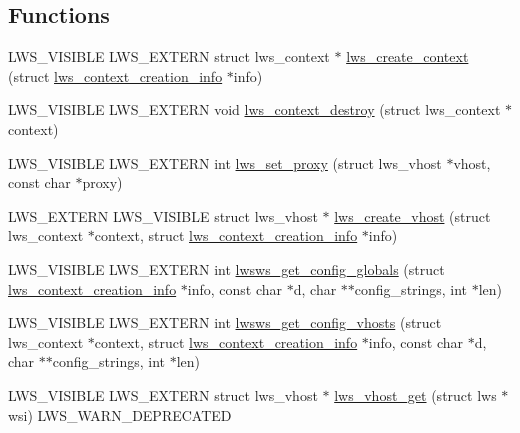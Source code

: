 \subsection*{Functions}
\begin{DoxyCompactItemize}
\item 
L\+W\+S\+\_\+\+V\+I\+S\+I\+B\+LE L\+W\+S\+\_\+\+E\+X\+T\+E\+RN struct lws\+\_\+context $\ast$ \hyperlink{group__context-and-vhost_gaf2fff58562caab7510c41eeac85a8648}{lws\+\_\+create\+\_\+context} (struct \hyperlink{structlws__context__creation__info}{lws\+\_\+context\+\_\+creation\+\_\+info} $\ast$info)
\item 
L\+W\+S\+\_\+\+V\+I\+S\+I\+B\+LE L\+W\+S\+\_\+\+E\+X\+T\+E\+RN void \hyperlink{group__context-and-vhost_ga8ee0314028755f1ddfa9428e09b4fddb}{lws\+\_\+context\+\_\+destroy} (struct lws\+\_\+context $\ast$context)
\item 
L\+W\+S\+\_\+\+V\+I\+S\+I\+B\+LE L\+W\+S\+\_\+\+E\+X\+T\+E\+RN int \hyperlink{group__context-and-vhost_ga7e9d5405547a457d86e0b4f0ae2bb1c4}{lws\+\_\+set\+\_\+proxy} (struct lws\+\_\+vhost $\ast$vhost, const char $\ast$proxy)
\item 
L\+W\+S\+\_\+\+E\+X\+T\+E\+RN L\+W\+S\+\_\+\+V\+I\+S\+I\+B\+LE struct lws\+\_\+vhost $\ast$ \hyperlink{group__context-and-vhost_ga0c54c667ccd9b8b3dddcd123ca72f87c}{lws\+\_\+create\+\_\+vhost} (struct lws\+\_\+context $\ast$context, struct \hyperlink{structlws__context__creation__info}{lws\+\_\+context\+\_\+creation\+\_\+info} $\ast$info)
\item 
L\+W\+S\+\_\+\+V\+I\+S\+I\+B\+LE L\+W\+S\+\_\+\+E\+X\+T\+E\+RN int \hyperlink{group__context-and-vhost_ga98d88c9080fd89c37114363a6474ea73}{lwsws\+\_\+get\+\_\+config\+\_\+globals} (struct \hyperlink{structlws__context__creation__info}{lws\+\_\+context\+\_\+creation\+\_\+info} $\ast$info, const char $\ast$d, char $\ast$$\ast$config\+\_\+strings, int $\ast$len)
\item 
L\+W\+S\+\_\+\+V\+I\+S\+I\+B\+LE L\+W\+S\+\_\+\+E\+X\+T\+E\+RN int \hyperlink{group__context-and-vhost_ga341064721add2618ae1b29717493a212}{lwsws\+\_\+get\+\_\+config\+\_\+vhosts} (struct lws\+\_\+context $\ast$context, struct \hyperlink{structlws__context__creation__info}{lws\+\_\+context\+\_\+creation\+\_\+info} $\ast$info, const char $\ast$d, char $\ast$$\ast$config\+\_\+strings, int $\ast$len)
\item 
L\+W\+S\+\_\+\+V\+I\+S\+I\+B\+LE L\+W\+S\+\_\+\+E\+X\+T\+E\+RN struct lws\+\_\+vhost $\ast$ \hyperlink{group__context-and-vhost_ga8db03e19a372e34ac25cf21af894a02c}{lws\+\_\+vhost\+\_\+get} (struct lws $\ast$wsi) L\+W\+S\+\_\+\+W\+A\+R\+N\+\_\+\+D\+E\+P\+R\+E\+C\+A\+T\+ED

\end{DoxyCompactItemize}
